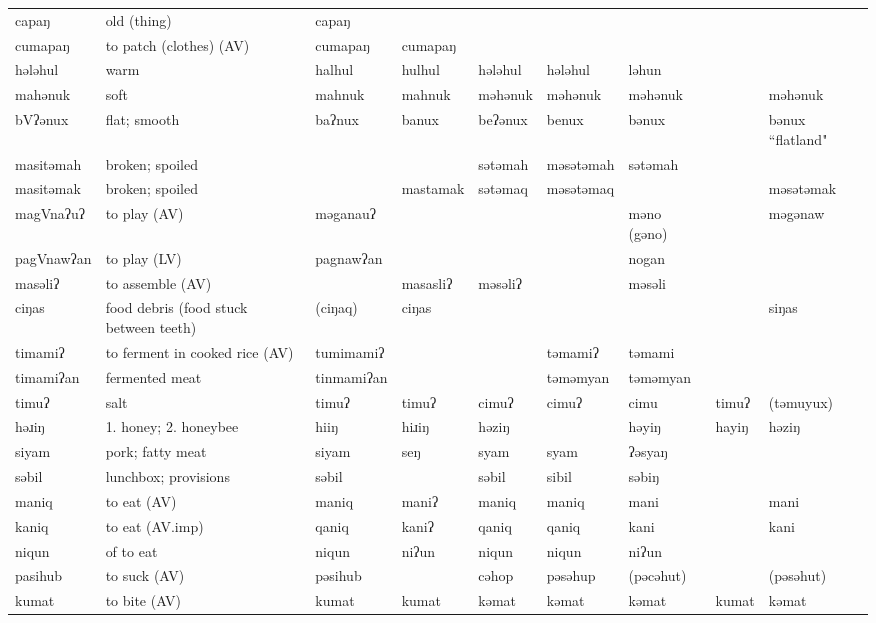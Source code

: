 \begin{landscape}
\begin{longtable}{*{9}{p{}}}
\text{*}capaŋ & old (thing) & capaŋ &  &  &  &  &  & \\
\text{*}cumapaŋ & to patch (clothes) (AV) & cumapaŋ & cumapaŋ &  &  &  &  & \\
\text{*}hələhul & warm & halhul & hulhul & hələhul & hələhul & ləhun &  & \\
\text{*}mahənuk & soft & mahnuk & mahnuk & məhənuk & məhənuk & məhənuk &  & məhənuk\\
\text{*}bVʔənux & flat; smooth & baʔnux & banux & beʔənux & benux & bənux &  & bənux ``flatland"\\
\text{*}masitəmah & broken; spoiled &  &  & sətəmah & məsətəmah & sətəmah &  & \\
\text{*}masitəmak & broken; spoiled &  & mastamak & sətəmaq & məsətəmaq &  &  & məsətəmak\\
\text{*}magVnaʔuʔ & to play (AV) & məganauʔ &  &  &  & məno (gəno) &  & məgənaw\\
\text{*}pagVnawʔan & to play (LV) & pagnawʔan &  &  &  & nogan &  & \\
\text{*}masəliʔ & to assemble (AV) &  & masasliʔ & məsəliʔ &  & məsəli &  & \\
\text{*}ciŋas & food debris (food stuck between teeth) & (ciŋaq) & ciŋas &  &  &  &  & siŋas\\
\text{*}timamiʔ & to ferment in cooked rice (AV) & tumimamiʔ &  &  & təmamiʔ & təmami &  & \\
\text{*}timamiʔan & fermented meat & tinmamiʔan &  &  & təməmyan & təməmyan &  & \\
\text{*}timuʔ & salt & timuʔ & timuʔ & cimuʔ & cimuʔ & cimu & timuʔ & (təmuyux)\\
\text{*}həɹiŋ & 1. honey; 2. honeybee & hiiŋ & hiɹiŋ & həziŋ &  & həyiŋ & hayiŋ & həziŋ\\
\text{*}siyam & pork; fatty meat & siyam & seŋ & syam & syam & ʔəsyaŋ &  & \\
\text{*}səbil & lunchbox; provisions & səbil &  & səbil & sibil & səbiŋ &  & \\
\text{*}maniq & to eat (AV) & maniq & maniʔ & maniq & maniq & mani &  & mani\\
\text{*}kaniq & to eat (AV.imp) & qaniq & kaniʔ & qaniq & qaniq & kani &  & kani\\
\text{*}niqun & of to eat & niqun & niʔun & niqun & niqun & niʔun &  & \\
\text{*}pasihub & to suck (AV) & pəsihub &  & cəhop & pəsəhup & (pəcəhut) &  & (pəsəhut)\\
\text{*}kumat & to bite (AV) & kumat & kumat & kəmat & kəmat & kəmat & kumat & kəmat\\

\end{longtable}
\end{landscape}
